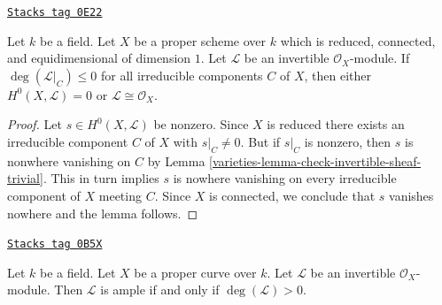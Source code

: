 \begin{lemma}
\label{varieties-lemma-no-sections-dual-nef}
\href{https://stacks.math.columbia.edu/tag/0E22}{\texttt{Stacks tag 0E22}}

Let $k$ be a field. Let $X$ be a proper scheme over $k$
which is reduced, connected, and equidimensional of dimension $1$.
Let $\mathcal{L}$ be an invertible $\mathcal{O}_X$-module.
If $\deg(\mathcal{L}|_C) \leq 0$ for all irreducible components $C$
of $X$, then either $H^0(X, \mathcal{L}) = 0$ or
$\mathcal{L} \cong \mathcal{O}_X$.
\end{lemma}

\begin{proof}

Let $s \in H^0(X, \mathcal{L})$ be nonzero. Since $X$ is reduced there exists
an irreducible component $C$ of $X$ with $s|_C \not = 0$.
But if $s|_C$ is nonzero, then
$s$ is nonwhere vanishing on $C$ by
Lemma \ref{varieties-lemma-check-invertible-sheaf-trivial}.
This in turn implies $s$ is nowhere vanishing on
every irreducible component of $X$ meeting $C$.
Since $X$ is connected, we conclude that $s$
vanishes nowhere and the lemma follows.
\end{proof}

\begin{lemma}
\label{varieties-lemma-ample-curve}
\href{https://stacks.math.columbia.edu/tag/0B5X}{\texttt{Stacks tag 0B5X}}

Let $k$ be a field. Let $X$ be a proper curve over $k$.
Let $\mathcal{L}$ be an invertible $\mathcal{O}_X$-module.
Then $\mathcal{L}$ is ample if and only if $\deg(\mathcal{L}) > 0$.
\end{lemma}


